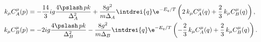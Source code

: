 \begin{equation}
\label{eq:system_cab}
\begin{split}
  k_\mu C^\mu_A(p)&= 
    -\frac{14}{3}ig\frac{4\pslash\,pk}{\Delta_A^2} 
    +\frac{8g^2}{m\Delta_A}\intdrei{q} \e^{-E_q/T}
    \left( 2\,k_\mu C^\mu_A(q)+\frac{2}{3}\,k_\mu C^\mu_B(q) \right),\\
  k_\mu C^\mu_B(p)&=
    -2ig\frac{4\pslash\,pk}{\Delta_B^2}
    -\frac{8g^2}{m\Delta_B}\intdrei{q} \e^{-E_q/T}
    \left(-\frac{2}{3}\,k_\mu C^\mu_A(q)+\frac{2}{3}\,k_\mu C^\mu_B(q)
  \right).
\end{split}
\end{equation}

